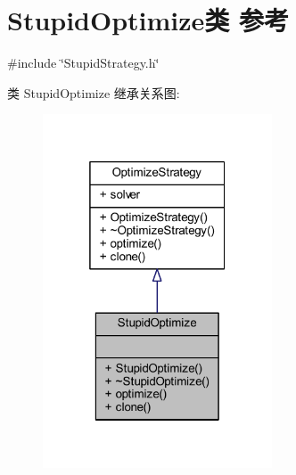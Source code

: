 \hypertarget{classStupidOptimize}{}\section{Stupid\+Optimize类 参考}
\label{classStupidOptimize}


{\ttfamily \#include \char`\"{}Stupid\+Strategy.\+h\char`\"{}}



类 Stupid\+Optimize 继承关系图\+:
\nopagebreak
\begin{figure}[H]
\begin{center}
\leavevmode
\includegraphics[width=193pt]{classStupidOptimize__inherit__graph}
\end{center}
\end{figure}


